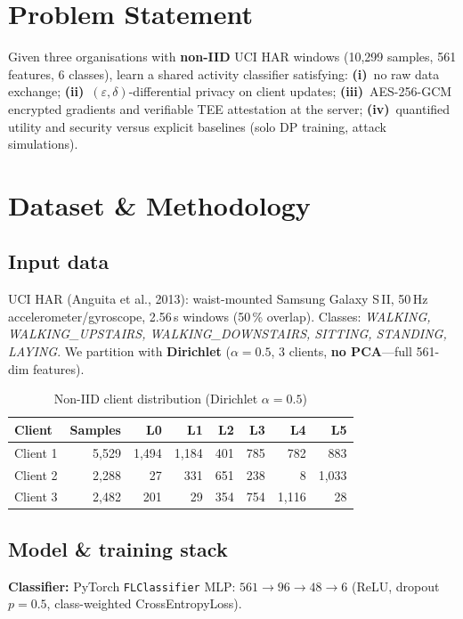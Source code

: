 \documentclass[10pt,a4paper,twocolumn]{article}
\begin{document}
\section{Problem Statement}
Given three organisations with \textbf{non-IID} UCI HAR windows (10{,}299 samples, 561 features, 6 classes), learn a shared activity classifier satisfying:
\textbf{(i)}~no raw data exchange;
\textbf{(ii)}~$(\varepsilon,\delta)$-differential privacy on client updates;
\textbf{(iii)}~AES-256-GCM encrypted gradients and verifiable TEE attestation at the server;
\textbf{(iv)}~quantified utility and security versus explicit baselines (solo DP training, attack simulations).

\section{Dataset \& Methodology}

\subsection{Input data}
UCI HAR (Anguita et al., 2013): waist-mounted Samsung Galaxy S\,II, 50\,Hz accelerometer/gyroscope, 2.56\,s windows (50\,\% overlap). Classes: \textit{WALKING, WALKING\_UPSTAIRS, WALKING\_DOWNSTAIRS, SITTING, STANDING, LAYING}. We partition with \textbf{Dirichlet} ($\alpha{=}0.5$, 3 clients, \textbf{no PCA}---full 561-dim features).

\begin{table}[h!]
\centering
\caption{Non-IID client distribution (Dirichlet $\alpha{=}0.5$)}
\small
{}
\begin{tabular}{@{}lrrrrrrr@{}}
\toprule
\textbf{Client} & \textbf{Samples} & \textbf{L0} & \textbf{L1} & \textbf{L2} & \textbf{L3} & \textbf{L4} & \textbf{L5} \\
\midrule
Client 1 & 5{,}529 & 1{,}494 & 1{,}184 & 401 & 785 & 782 & 883 \\
Client 2 & 2{,}288 & 27 & 331 & 651 & 238 & 8 & 1{,}033 \\
Client 3 & 2{,}482 & 201 & 29 & 354 & 754 & 1{,}116 & 28 \\
\bottomrule
\end{tabular}
\end{table}

\subsection{Model \& training stack}
\textbf{Classifier:} PyTorch \texttt{FLClassifier} MLP: $561 \!\to\! 96 \!\to\! 48 \!\to\! 6$ (ReLU, dropout $p{=}0.5$, class-weighted CrossEntropyLoss).
\end{document}
